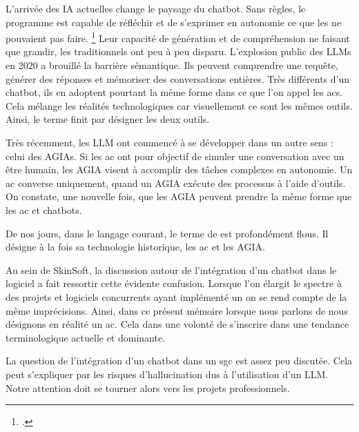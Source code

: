 L'arrivée des \gls{IA} actuelles change le paysage du \gls{chatbot}. Sans règles, le programme est capable de réfléchir et de s'exprimer en autonomie ce que les  ne pouvaient pas faire. \footcite{adamopoulouChatbotsHistoryTechnology2020}
Leur capacité de génération et de compréhension ne faisant que grandir, les  traditionnels ont peu à peu disparu. L'explosion public des \glspl{LLM} en 2020 a brouillé la barrière sémantique. Ils peuvent comprendre une requête, générer des réponses et mémoriser des conversations entières. Très différents d'un \gls{chatbot}, ils en adoptent pourtant la même forme dans ce que l'on appel les \glspl{ac}. Cela mélange les réalités technologiques car visuellement ce sont les mêmes outils. Ainsi, le terme  finit par désigner les deux outils.

Très récemment, les \gls{LLM} ont commencé à se développer dans un autre sens : celui des \glspl{AGIA}. Si les \gls{ac} ont pour objectif de simuler une conversation avec un être humain, les \gls{AGIA} visent à accomplir des tâches complexes en autonomie. Un \gls{ac} converse uniquement, quand un \gls{AGIA} exécute des processus à l'aide d'outils. On constate, une nouvelle fois, que les \gls{AGIA} peuvent prendre la même forme que les \gls{ac} et \glspl{chatbot}.\newline

De nos jours, dans le langage courant, le terme de  est profondément flous. Il désigne à la fois sa technologie historique, les \gls{ac} et les \gls{AGIA}.

Au sein de SkinSoft, la discussion autour de l'intégration d'un \gls{chatbot} dans le logiciel a fait ressortir cette évidente confusion. Lorsque l'on élargit le spectre à des projets et logiciels concurrents ayant implémenté un  on se rend compte de la même imprécisions. Ainsi, dans ce présent mémoire lorsque nous parlons de  nous désignons en réalité un \gls{ac}. Cela dans une volonté de s'inscrire dans une tendance terminologique actuelle et dominante. \newline

La question de l'intégration d'un \gls{chatbot} dans un \gls{sgc} est assez peu discutée. Cela peut s'expliquer par les risques d'hallucination dus à l'utilisation d'un \gls{LLM}. Notre attention doit se tourner alors vers les projets professionnels. 

